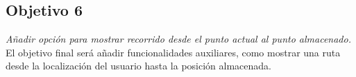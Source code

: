 \subsection{Objetivo 6}
\emph{Añadir opción para mostrar recorrido desde el punto actual al punto almacenado.}\\
El objetivo final será añadir funcionalidades auxiliares, como mostrar una ruta desde la localización del usuario hasta la posición almacenada.


